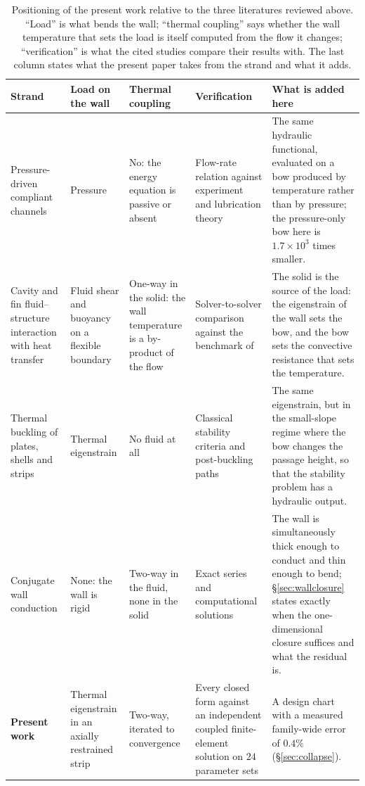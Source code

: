 \documentclass[11pt,a4paper]{article}
\begin{document}
\begin{table}[htbp]
\centering
\caption{Positioning of the present work relative to the three literatures reviewed above.
``Load'' is what bends the wall; ``thermal coupling'' says whether the wall temperature that
sets the load is itself computed from the flow it changes; ``verification'' is what the cited
studies compare their results with. The last column states what the present paper takes from
the strand and what it adds.}
\label{tab:positioning}
\footnotesize
\begin{tabular}{@{}p{3.0cm}p{2.5cm}p{2.6cm}p{3.0cm}p{3.2cm}@{}}
\toprule
Strand & Load on the wall & Thermal coupling & Verification & What is added here\\
\midrule
Pressure-driven compliant channels
\citep{gervais2006flow,christov2018flow,wang2019theory,boyko2022flow} &
Pressure &
No: the energy equation is passive or absent &
Flow-rate relation against experiment and lubrication theory &
The same hydraulic functional, evaluated on a bow produced by temperature rather than by
pressure; the pressure-only bow here is $1.7\times10^{3}$ times smaller.\\
Cavity and fin fluid--structure interaction with heat transfer
\citep{soti2015flow,alamiri2011fluid,alsabery2019transient,zargartalebi2018fluid} &
Fluid shear and buoyancy on a flexible boundary &
One-way in the solid: the wall temperature is a by-product of the flow &
Solver-to-solver comparison against the benchmark of \citet{turek2006proposal} &
The solid is the source of the load: the eigenstrain of the wall sets the bow, and the bow
sets the convective resistance that sets the temperature.\\
Thermal buckling of plates, shells and strips
\citep{mansfield1962bending,hoff1964buckling,ross1965buckling,mehrabi2025axisymmetric} &
Thermal eigenstrain &
No fluid at all &
Classical stability criteria and post-buckling paths &
The same eigenstrain, but in the small-slope regime where the bow changes the passage height,
so that the stability problem has a hydraulic output.\\
Conjugate wall conduction
\citep{quintero2017laminar,arici2010heat,rahimi2024numerical,vishnuvardhanarao2009computational} &
None: the wall is rigid &
Two-way in the fluid, none in the solid &
Exact series and computational solutions &
The wall is simultaneously thick enough to conduct and thin enough to bend; \S\ref{sec:wallclosure}
states exactly when the one-dimensional closure suffices and what the residual is.\\
\midrule
\textbf{Present work} &
Thermal eigenstrain in an axially restrained strip &
Two-way, iterated to convergence &
Every closed form against an independent coupled finite-element solution on $24$ parameter sets &
A design chart with a measured family-wide error of $0.4\%$ (\S\ref{sec:collapse}).\\
\bottomrule
\end{tabular}
\end{table}
\end{document}
